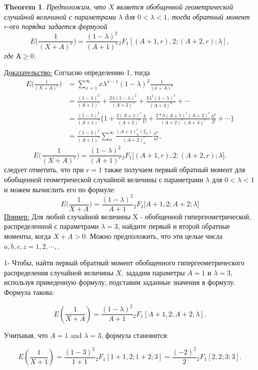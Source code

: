\documentclass[13pt]{article}
\newtheorem{theorem}{Theorem}
\begin{document}
\begin{theorem}
    Предположим, что $X$ является обобщенной геометрической случайной величиной с параметрами $\lambda$ для $0<\lambda<1$, тогда обратный момент $r\textit{-ого}$ порядка задается формулой
\[
E\bigg(\frac{1}{(X+A)^r}\bigg)= \frac{(1-\lambda)^2}{(A+1)^r}{}_2F_{1}[(A+1,r),2;(A+2,r);\lambda],
\]
где $\textbf{А}\ge 0$.
\end{theorem} 
\underline{Доказательство:} Согласно определению 1, тогда
\begin{align*}
    E\bigg(\frac{1}{(X+A)^r}\bigg) &= \sum_{x=1}^{\infty}x\lambda^{x-1}(1-\lambda)^{2}\frac{1}{(x+A)^r}\\
    &= \frac{(1-\lambda)^2}{(A+1)^r}+\frac{2\lambda(1-\lambda)^2}{(A+2)^r}+\frac{3\lambda^2(1-\lambda)^2}{(A+3)^k}+ \cdots \\
    &= \frac{(1-\lambda)^2}{(A+1)^r}\Bigg\{1+\frac{2(A+1)^r}{(A+2)^r}\frac{\lambda}{1!}+\frac{2*3(A+1)^r(A+2)^r}{(A+2)^r(A+3)^r}\frac{\lambda^2}{2!}+\cdots\Bigg\} \\
    &= \frac{(1-\lambda)^2}{(A+1)^r}\sum_{n}^{\infty}\frac{(A+1)_{n}^{r}(2_n)}{(A+2)_{n}^{r}}\frac{\lambda^{n}}{n!},
\end{align*}
\begin{equation}\label{eq:9}
    E\bigg(\frac{1}{(X+A)^r}\bigg) = \frac{(1-\lambda)^2}{(A+1)^r}{}_2F_1 \Big[(A+1,r),2;(A+2,r);\lambda \Big].
\end{equation}
следует отметить, что при $r=1$ также получаем первый обратный момент для обобщенной геометрической случайной величины с параметрами $\lambda$ для $0<\lambda<1$ и можем вычислить его по формуле:
\[
E\bigg(\frac{1}{X+A}\bigg)=\frac{(1-\lambda)^2}{A+1}{}_2F_{1}\Big[A+1,2;A+2;\lambda\Big]
\]
\underline{Пример:}
Для любой случайной величины X - обобщенной гипергеометрической, распределенной с параметрами $\lambda = 3$, найдите первый и второй обратные моменты, когда $X+A>0$. Можно предположить, что эти  целые числа $a,b, c,z = 1,2,\cdots,$.

1- Чтобы, найти первый обратный момент обобщенного гипергеометрического распределения случайной величины \(X\), зададим параметры \(A = 1\) и \( \lambda = 3\), используя приведенную формулу, подставим заданные значения в формулу. Формула такова:

\[ E\left(\frac{1}{X+A}\right) = \frac{(1-\lambda)^2}{A+1} {}_2F_{1}\left[A+1,2;A+2;\lambda\right]. \]

Учитывая, что \( A = 1 \) and \( \lambda = 3 \), формула становится:

\[ E\left(\frac{1}{X+1}\right) = \frac{(1-3)^2}{1+1} {}_2F_{1}\left[1+1,2;1+2;3\right] = \frac{(-2)^2}{2} {}_2F_{1}\left[2,2;3;3\right]. \]
\end{document}
